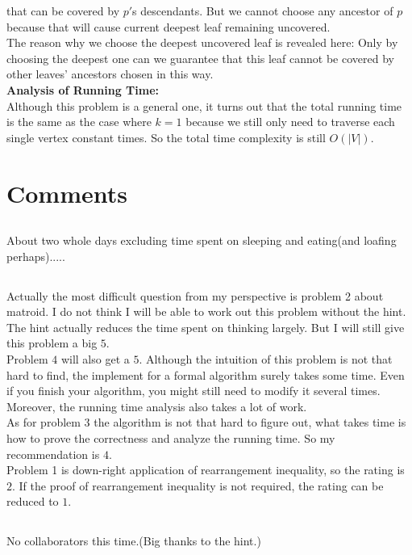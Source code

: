 \documentclass[12pt,letterpaper]{article}
\begin{document}
that can be covered by $p'$s descendants.
But we cannot choose any ancestor of $p$
because that will cause current deepest leaf remaining uncovered.\\
The reason why we choose the deepest uncovered leaf
is revealed here:
Only by choosing the deepest one can we guarantee that
this leaf cannot be covered by other leaves' ancestors chosen in this way.\\
\textbf{Analysis of Running Time:}\\
Although this problem is a general one, 
it turns out that the total running time is the same as 
the case where $k=1$
because we still only need to traverse each single vertex constant times.
So the total time complexity is still $O(|V|)$.

\section{Comments}
\subsection{}
About two whole days excluding time spent on sleeping and eating(and loafing perhaps).....
\subsection{}
Actually the most difficult question from my perspective is problem 2 about matroid.
I do not think I will be able to work out this problem without the hint.
The hint actually reduces the time spent on thinking largely.
But I will still give this problem a big $5$.\\
Problem $4$ will also get a $5$. 
Although the intuition of this problem is not that hard to find,
the implement for a formal algorithm surely takes some time.
Even if you finish your algorithm, 
you might still need to modify it several times.
Moreover, the running time analysis also takes a lot of work.\\
As for problem $3$ the algorithm is not that hard to figure out,
what takes time is how to prove the correctness and analyze the running time.
So my recommendation is $4$.\\
Problem 1 is down-right application of rearrangement inequality, so the rating is $2$.
If the proof of rearrangement inequality is not required, the rating can be reduced to $1$.
\subsection{}
No collaborators this time.(Big thanks to the hint.)
\end{document}
